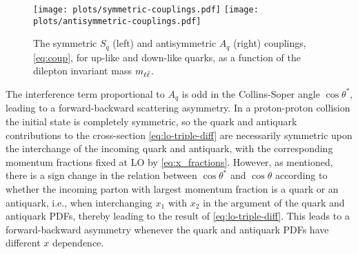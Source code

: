  
\begin{figure}
  \centering
  \texttt{[image: plots/symmetric-couplings.pdf]}
  \texttt{[image: plots/antisymmetric-couplings.pdf]}
  \caption{The symmetric $S_q$ (left) and antisymmetric $A_q$ (right)
    couplings, \cref{eq:coup}, for up-like and
    down-like quarks, as a function of 
 the dilepton invariant mass $m_{\ell\bar{\ell}}$.
  }
  \label{fig:lo-couplings}
\end{figure}

The interference term proportional to
$A_q$ is odd in the Collins-Soper angle $\cos\theta^*$, leading to a forward-backward
scattering asymmetry.
%
In a proton-proton collision the initial state is completely
symmetric, so the quark and antiquark contributions to the
cross-section \cref{eq:lo-triple-diff} are necessarily symmetric
upon the interchange of the incoming quark and antiquark, with the
corresponding momentum fractions fixed at LO by
\cref{eq:x_fractions}.
%
However, as mentioned, there
is a sign change in the relation between $\cos\theta^*$ and
$\cos\theta$ according to whether the incoming parton with largest
momentum fraction is a quark or an antiquark, i.e.,
when interchanging
$x_1$ with $x_2$ in the argument of the quark and antiquark PDFs,
thereby leading to the result of  \cref{eq:lo-triple-diff}.
%
This leads
to a forward-backward asymmetry whenever the quark and antiquark
PDFs have different $x$ dependence.

